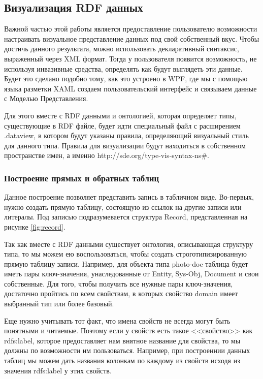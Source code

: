\documentclass[12pt]{article}
\begin{document}
\subsection{Визуализация RDF данных} \label{sect:Rdf_Vis}
\qquad Важной частью этой работы является предоставление пользователю возможности настраивать визуальное представление данных под свой собственный вкус. Чтобы достичь данного результата, можно использовать декларативный синтаксис, выраженный через XML формат. Тогда у пользователя появится возможность, не используя инвазивные средства, определять как будут выглядеть эти данные. Будет это сделано подобно тому, как это устроено в WPF, где мы с помощью языка разметки XAML создаем пользовательский интерфейс и связываем данные с Моделью Представления.

Для этого вместе с RDF данными и онтологией, которая определяет типы, существующие в RDF файле, будет идти специальный файл с расширением .dataview, в котором будут указаны правила, определяющий визуальный стиль для данного типа. Правила для визуализации будут находиться в собственном пространстве имен, а именно http://sde.org/type-vis-syntax-ns\#.

\subsubsection{Построение прямых и обратных таблиц} \label{sect:tables}
\qquad Данное построение позволяет представить запись в табличном виде. Во-первых, нужно создать прямую таблицу, состоящую из ссылок на другие записи или литералы. Под записью подразумевается структура Record, представленная на рисунке \ref{fig:record}.

Так как вместе с RDF данными существует онтология, описывающая структуру типа, то мы можем ею воспользоваться, чтобы создать строготипизированную прямую таблицу записи. Например, для объекта типа photo-doc таблица будет иметь пары ключ-значения, унаследованные от Entity, Sys-Obj, Document и свои собственные. Для того, чтобы получить все нужные пары ключ-значения, достаточно пройтись по всем свойствам, в которых свойство domain имеет выбранный тип или более базовый.

Еще нужно учитывать тот факт, что имена свойств не всегда могут быть понятными и читаемые. Поэтому если у свойств есть такое <<свойство>> как rdfs:label, которое предоставляет нам внятное название для свойства, то мы должны по возможности им пользоваться. Например, при построеннии данных таблиц мы можем дать названия колонкам по каждому из свойств исходя из значения rdfs:label у этих свойств.
\end{document}
